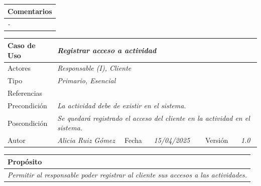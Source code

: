     \begin{table}[H]
    \begin{tabular}{llllllll}
    \hline
    \multicolumn{8}{|l|}{\cellcolor[HTML]{F2F2F2}Comentarios} \\ \hline
    \multicolumn{8}{|p{15cm}|}{{\color[HTML]{808080} \textit{-}}} \\ \hline
    \end{tabular}
    \end{table}
    

    \begin{table}[H]
        \centering
        \begin{tabular}{llllllll}
        \hline
        \multicolumn{1}{|l|}{Caso de Uso} & \multicolumn{5}{l|}{{\color[HTML]{808080} \textit{Registrar acceso a actividad}}} & \multicolumn{2}{l|}{\cellcolor[HTML]{E6E6E6}{\color[HTML]{808080} \textit{CU-25}}} \\ \hline
        \multicolumn{1}{|l|}{Actores} & \multicolumn{7}{l|}{{\color[HTML]{808080} \textit{Responsable (I), Cliente}}} \\ \hline
        \multicolumn{1}{|l|}{Tipo} & \multicolumn{7}{l|}{{\color[HTML]{808080} \textit{Primario, Esencial}}} \\ \hline
        \multicolumn{1}{|l|}{Referencias} & \multicolumn{7}{l|}{} \\ \hline
        \multicolumn{1}{|l|}{Precondición} & \multicolumn{7}{p{10cm}|}{{\color[HTML]{808080} \textit{La actividad debe de existir en el sistema.}}} \\ \hline
        \multicolumn{1}{|l|}{Poscondición} & \multicolumn{7}{p{10cm}|}{{\color[HTML]{808080} \textit{Se quedará registrado el acceso del cliente en la actividad en el sistema.}}} \\ \hline
        \multicolumn{1}{|l|}{Autor} & \multicolumn{1}{l|}{{\color[HTML]{808080} \textit{Alicia Ruiz Gómez}}} & \multicolumn{2}{l|}{Fecha} & \multicolumn{1}{l|}{{\color[HTML]{808080} \textit{15/04/2025}}} & \multicolumn{2}{l|}{Versión} & \multicolumn{1}{l|}{{\color[HTML]{808080} \textit{1.0}}} \\ \hline
        \end{tabular}
        \end{table}
        
        \begin{table}[H]
        \begin{tabular}{llllllll}
        \hline
        \multicolumn{8}{|l|}{\cellcolor[HTML]{F2F2F2}Propósito} \\ \hline
        \multicolumn{8}{|p{15cm}|}{{\color[HTML]{808080} \textit{Permitir al responsable poder registrar al cliente sus accesos a las actividades.}}} \\ \hline
        \end{tabular}
        \end{table}
        
